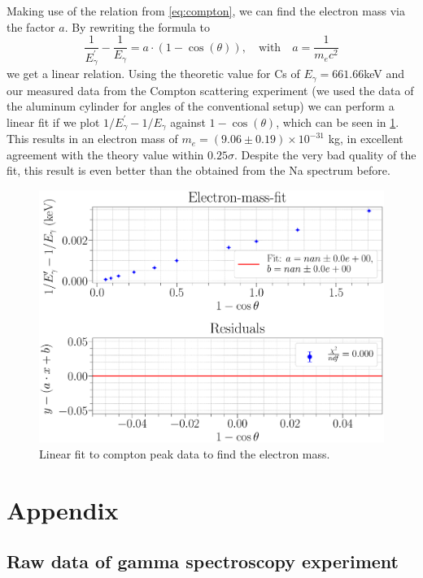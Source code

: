 \documentclass[a4paper,12pt]{article}
\begin{document}
Making use of the relation from \cref{eq:compton}, we can find the electron mass via the factor $a$. By rewriting the formula to 
\begin{equation}
	\frac{1}{E_\gamma^\prime} - \frac{1}{E_\gamma} = a \cdot (1 - \cos(\theta)), \quad \mathrm{with} \quad a = \frac{1}{m_e c^2}
\end{equation}
we get a linear relation. Using the theoretic value for Cs of $E_\gamma = 661.66$keV and our measured data from the Compton scattering experiment (we used the data of the aluminum cylinder for angles of the conventional setup) we can perform a linear fit if we plot $1/E_\gamma^\prime - 1/E_\gamma$ against $1-\cos(\theta)$, which can be seen in \cref{fig:mefit}. This results in an electron mass of $m_e = (9.06 \pm 0.19) \times 10^{-31}$ kg, in excellent agreement with the theory value within $0.25 \sigma$. Despite the very bad quality of the fit, this result is even better than the obtained from the Na spectrum before.

\begin{figure}[H]
	\centering
	\includegraphics[scale=0.25]{../Figures/Electron-mass-fit.eps}
	\caption{Linear fit to compton peak data to find the electron mass.}
	\label{fig:mefit}
\end{figure}


\clearpage
\section{Appendix}

\subsection{Raw data of gamma spectroscopy experiment}
\end{document}
